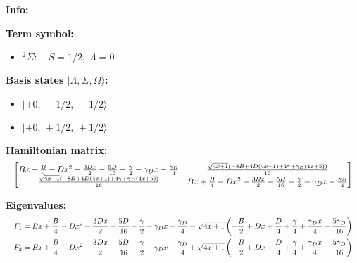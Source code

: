 \documentclass[12pt]{article}
\begin{document}
\pagestyle{empty}

\textbf{Info:}

\textbf{Term symbol:}
\begin{itemize}
\item $^2\Sigma:\quad S=1/2,\;$
\end{itemize}

\textbf{Basis states $\lvert \Lambda,\Sigma,\Omega\rangle$:}
\begin{itemize}
\item $\lvert {},\,-1/2,\,-1/2\rangle$
\item $\lvert {},\,+1/2,\,+1/2\rangle$
\end{itemize}

\textbf{Hamiltonian matrix:}
\begin{equation*}
\resizebox{\linewidth}{!}{$
\left[\begin{matrix}B x + \frac{B}{4} - D x^{2} - \frac{3 D x}{2} - \frac{5 D}{16} - \frac{\gamma}{2} - \gamma_{D} x - \frac{\gamma_{D}}{4} & \frac{\sqrt{4 x + 1} \left(- 8 B + 4 D \left(4 x + 1\right) + 4 \gamma + \gamma_{D} \left(4 x + 5\right)\right)}{16}\\\frac{\sqrt{4 x + 1} \left(- 8 B + 4 D \left(4 x + 1\right) + 4 \gamma + \gamma_{D} \left(4 x + 5\right)\right)}{16} & B x + \frac{B}{4} - D x^{2} - \frac{3 D x}{2} - \frac{5 D}{16} - \frac{\gamma}{2} - \gamma_{D} x - \frac{\gamma_{D}}{4}\end{matrix}\right]
$}
\end{equation*}

\textbf{Eigenvalues:}
\begin{equation*}
\resizebox{\linewidth}{!}{$
\begin{aligned}
F_{1} &= B x + \frac{B}{4} - D x^{2} - \frac{3 D x}{2} - \frac{5 D}{16} - \frac{\gamma}{2} - \gamma_{D} x - \frac{\gamma_{D}}{4} - \sqrt{4 x + 1} \left(- \frac{B}{2} + D x + \frac{D}{4} + \frac{\gamma}{4} + \frac{\gamma_{D} x}{4} + \frac{5 \gamma_{D}}{16}\right) \\
F_{2} &= B x + \frac{B}{4} - D x^{2} - \frac{3 D x}{2} - \frac{5 D}{16} - \frac{\gamma}{2} - \gamma_{D} x - \frac{\gamma_{D}}{4} + \sqrt{4 x + 1} \left(- \frac{B}{2} + D x + \frac{D}{4} + \frac{\gamma}{4} + \frac{\gamma_{D} x}{4} + \frac{5 \gamma_{D}}{16}\right) \\
\end{aligned}
$}
\end{equation*}
\end{document}
